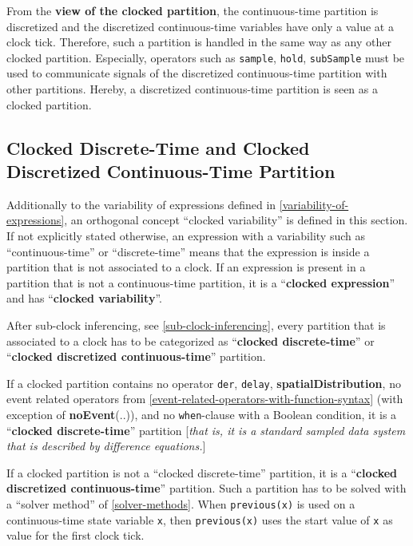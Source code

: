 From the \textbf{view of the clocked partition}, the continuous-time
partition is discretized and the discretized continuous-time variables
have only a value at a clock tick. Therefore, such a partition is
handled in the same way as any other clocked partition. Especially,
operators such as \lstinline!sample!, \lstinline!hold!, \lstinline!subSample! must be used to communicate
signals of the discretized continuous-time partition with other
partitions. Hereby, a discretized continuous-time partition is seen as a
clocked partition.


\subsection{Clocked Discrete-Time and Clocked Discretized Continuous-Time Partition}

Additionally to the variability of expressions defined in \autoref{variability-of-expressions},
an orthogonal concept ``clocked variability'' is defined in this
section. If not explicitly stated otherwise, an expression with a
variability such as ``continuous-time'' or ``discrete-time'' means that
the expression is inside a partition that is not associated to a clock.
If an expression is present in a partition that is not a continuous-time
partition, it is a ``\textbf{clocked expression}'' and has
``\textbf{clocked variability}''.

After sub-clock inferencing, see \autoref{sub-clock-inferencing}, every partition that is
associated to a clock has to be categorized as ``\textbf{clocked
discrete-time}'' or ``\textbf{clocked discretized continuous-time}''
partition.

If a clocked partition contains no operator \lstinline!der!,
\lstinline!delay!, \textbf{spatialDistribution}, no event related operators
from \autoref{event-related-operators-with-function-syntax} (with exception of \textbf{noEvent}(..)), and no
\lstinline!when!-clause with a Boolean condition, it is a ``\textbf{clocked
discrete-time}'' partition {[}\emph{that is, it is a standard sampled
data system that is described by difference equations.}{]}

If a clocked partition is not a ``clocked discrete-time'' partition, it
is a ``\textbf{clocked discretized continuous-time}'' partition. Such a
partition has to be solved with a ``solver method'' of \autoref{solver-methods}.
When \lstinline!previous(x)! is used on a continuous-time state variable \lstinline!x!, then
\lstinline!previous(x)! uses the start value of \lstinline!x! as value for the first clock tick.

